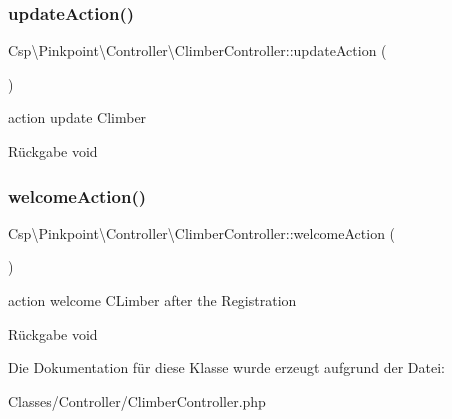 \subsubsection{\texorpdfstring{update\+Action()}{updateAction()}}
{\footnotesize\ttfamily Csp\textbackslash{}\+Pinkpoint\textbackslash{}\+Controller\textbackslash{}\+Climber\+Controller\+::update\+Action (\begin{DoxyParamCaption}{ }\end{DoxyParamCaption})}

action update Climber

\begin{DoxyReturn}{Rückgabe}
void 
\end{DoxyReturn}
\mbox{\label{classCsp_1_1Pinkpoint_1_1Controller_1_1ClimberController_af0655e8163acb5d127a2c07d7639d167}} 
\subsubsection{\texorpdfstring{welcome\+Action()}{welcomeAction()}}
{\footnotesize\ttfamily Csp\textbackslash{}\+Pinkpoint\textbackslash{}\+Controller\textbackslash{}\+Climber\+Controller\+::welcome\+Action (\begin{DoxyParamCaption}{ }\end{DoxyParamCaption})}

action welcome C\+Limber after the Registration

\begin{DoxyReturn}{Rückgabe}
void 
\end{DoxyReturn}


Die Dokumentation für diese Klasse wurde erzeugt aufgrund der Datei\+:\begin{DoxyCompactItemize}
\item 
Classes/\+Controller/Climber\+Controller.\+php\end{DoxyCompactItemize}
